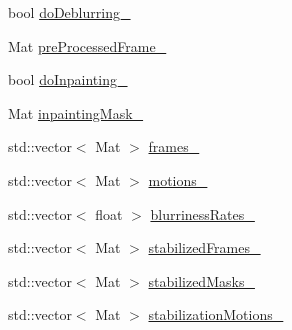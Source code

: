 \begin{DoxyCompactItemize}
\item 
bool \hyperlink{classcv_1_1videostab_1_1StabilizerBase_a39b55a0336972805eab06cab1ac0e727}{do\-Deblurring\-\_\-}
\item 
Mat \hyperlink{classcv_1_1videostab_1_1StabilizerBase_acffea61e04a38c512e09a643ae2c8d13}{pre\-Processed\-Frame\-\_\-}
\item 
bool \hyperlink{classcv_1_1videostab_1_1StabilizerBase_a5705ca2493231a2b041412434b25d37b}{do\-Inpainting\-\_\-}
\item 
Mat \hyperlink{classcv_1_1videostab_1_1StabilizerBase_a8e07199a116143e55c3566c722350b93}{inpainting\-Mask\-\_\-}
\item 
std\-::vector$<$ Mat $>$ \hyperlink{classcv_1_1videostab_1_1StabilizerBase_a1ea7895d1ad39d39fcea5e96a1bffa50}{frames\-\_\-}
\item 
std\-::vector$<$ Mat $>$ \hyperlink{classcv_1_1videostab_1_1StabilizerBase_a0f134ba4672305e6949a62cdfd8b8d36}{motions\-\_\-}
\item 
std\-::vector$<$ float $>$ \hyperlink{classcv_1_1videostab_1_1StabilizerBase_ad515524cacce64cea069d6d85ca85be5}{blurriness\-Rates\-\_\-}
\item 
std\-::vector$<$ Mat $>$ \hyperlink{classcv_1_1videostab_1_1StabilizerBase_afbf3e2dd807b19647b545585cf0dbd3e}{stabilized\-Frames\-\_\-}
\item 
std\-::vector$<$ Mat $>$ \hyperlink{classcv_1_1videostab_1_1StabilizerBase_ac77d036c0a94ca9b34ae8f8c69ac220d}{stabilized\-Masks\-\_\-}
\item 
std\-::vector$<$ Mat $>$ \hyperlink{classcv_1_1videostab_1_1StabilizerBase_aeb86f1064652cceb6f9a1735a81da5af}{stabilization\-Motions\-\_\-}
\end{DoxyCompactItemize}



